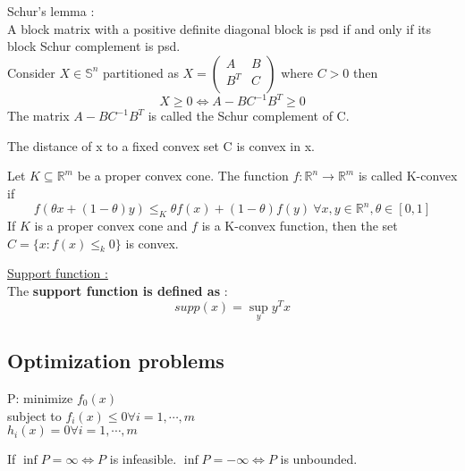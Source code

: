 \documentclass[../main.tex]{subfiles}
\begin{document}
\begin{theorem}
    Schur's lemma :\\
    A block matrix with a positive definite diagonal block is psd if and only if its block Schur complement is psd.\\
    Consider $X \in \mathbb{S}^n$ partitioned as $X =\begin{pmatrix}
        A & B\\ B^T & C\\
    \end{pmatrix}$ where $C>0$ then \begin{equation}
        X\geq 0 \Leftrightarrow A-BC^{-1}B^T \geq0
    \end{equation}
    The matrix $A-BC^{-1}B^T$ is called the Schur complement of C.
\end{theorem}

\warning The distance of x to a fixed convex set C is convex in x.\\

\begin{theorem}
    Let $K\subseteq \mathbb{R}^m$ be a proper convex cone. The function $f: \mathbb{R}^n \rightarrow \mathbb{R}^m$ is called K-convex if \begin{equation}
        f(\theta x + (1-\theta)y) \leq_K \theta f(x) + (1-\theta) f(y) \: \forall x,y \in \mathbb{R}^n, \theta \in [0,1]
    \end{equation} 
    If $K$ is a proper convex cone and $f$ is a K-convex function, then the set $C = \{x : f(x) \leq_k 0\}$ is convex.
\end{theorem}

\quad \underline{Support function :}\\
The \textbf{support function is defined as} : \begin{equation}
    supp(x) = \sup_y y^T x
\end{equation}

\subsection{Optimization problems}

\begin{center}
    P: minimize $f_0(x)$\\
    subject to $f_i(x) \leq 0 \forall i=1,\cdots, m$\\
    $h_i(x) = 0 \forall i=1,\cdots, m$
\end{center}

If $\inf P = \infty \Leftrightarrow P$ is infeasible. $\inf P = -\infty \Leftrightarrow P$ is unbounded.\\
\end{document}
